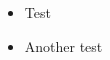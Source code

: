 \documentclass{beamer}
\begin{document}
\begin{frame}
    \begin{itemize}
        \item<1-> Test
        \item<2-> Another test
    \end{itemize}


\end{frame}
\end{document}
